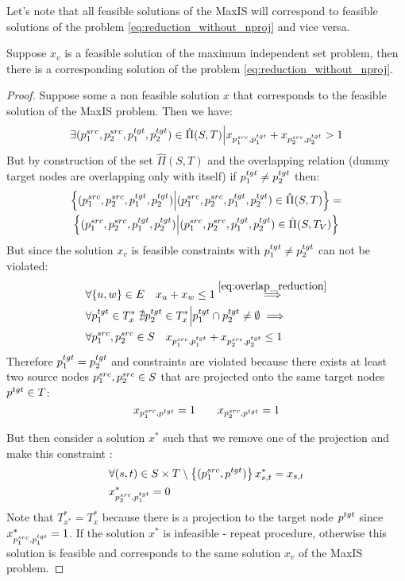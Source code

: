 Let's note that all feasible solutions of the MaxIS will correspond to feasible solutions of the
problem \ref{eq:reduction_without_nproj} and vice versa.

\begin{lemma} \label{lemma:maxis_f_implies_ilp}
  Suppose \( x_v \) is a feasible solution of the maximum independent set problem, then there is a
  corresponding solution of the problem \eqref{eq:reduction_without_nproj}.
\end{lemma}
\begin{proof}
  Suppose some a non feasible solution \( x \) that corresponds to the feasible solution of the
  MaxIS problem. Then we have:
  \[
    \exists (p_1^{src}, p_2^{src}, p_1^{tgt}, p_2^{tgt}) \in \hat{\Pi}(S, T) \Big|
    x_{p_1^{src}, p_1^{tgt}} + x_{p_2^{src}, p_2^{tgt}} > 1
  \]
  But by construction of the set \( \hat{\Pi}(S, T) \) and the overlapping relation (dummy target nodes
  are overlapping only with itself) if \( p_1^{tgt} \neq p_2^{tgt} \) then:
  \begin{multline*}
    \left\{ (p_1^{src}, p_2^{src}, p_1^{tgt}, p_2^{tgt}) \Big| (p_1^{src}, p_2^{src}, p_1^{tgt}, p_2^{tgt}) \in \hat{\Pi}(S, T) \right\} = \\
    \left\{ (p_1^{src}, p_2^{src}, p_1^{tgt}, p_2^{tgt}) \Big| (p_1^{src}, p_2^{src}, p_1^{tgt}, p_2^{tgt}) \in \hat{\Pi}(S, T_V) \right\}
  \end{multline*}
  But since the solution \( x_v \) is feasible constraints with  \( p_1^{tgt} \neq p_2^{tgt} \) can not be violated:
  \begin{align*}
    & \forall \{ u, w \} \in E \quad x_u + x_w \leq 1 \stackrel{\eqref{eq:overlap_reduction}}{\implies}                  \\
    & \forall p_1^{tgt} \in T^*_x \; \nexists p_2^{tgt} \in T^*_x \Big| p_1^{tgt} \cap p_2^{tgt} \neq \emptyset \implies \\
    & \forall p_1^{src}, p_2^{src} \in S \quad x_{p_1^{src}, p_1^{tgt}} + x_{p_2^{src}, p_2^{tgt}} \leq 1
  \end{align*}
  Therefore \( p_1^{tgt} = p_2^{tgt} \) and constraints are violated because there exists
  at least two source nodes \( p_1^{src}, p_2^{src} \in S \) that are projected onto the same target nodes \( p^{tgt} \in T \):
  \[
    x_{p_1^{src}, p^{tgt}} = 1 \qquad x_{p_2^{src}, p^{tgt}} = 1
  \]

  But then consider a solution \( x^* \) such that we remove one of the projection and make this constraint :
  \begin{align*}
    & \forall (s,t) \in S \times T \setminus \left\{ (p_1^{src}, p^{tgt}) \right\} x^*_{s,t} = x_{s,t} \\
    & x^*_{p_2^{src}, p_1^{tgt}} = 0
  \end{align*}
  Note that \( T^*_{x^*} = T^*_x  \) because there is a projection to the target node \( p^{tgt} \)
  since \( \)  \( x^*_{p_1^{src}, p_1^{tgt}} = 1 \).
  If the solution \( x^* \) is infeasible - repeat procedure, otherwise
  this solution is feasible and corresponds to the same solution \( x_v \) of the MaxIS problem.
\end{proof}

